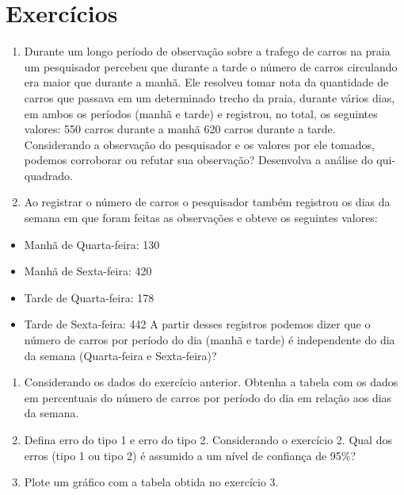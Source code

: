 \documentclass[14pt,titlepage, oneside, openany, a4paper]{book}
\providecommand{\tightlist}{%
  \setlength{\itemsep}{0pt}\setlength{\parskip}{0pt}}
\begin{document}
\hypertarget{exercuxedcios-2}{%
\section{Exercícios}\label{exercuxedcios-2}}

\begin{enumerate}
\def\labelenumi{\arabic{enumi})}
\item
  Durante um longo período de observação sobre a trafego de carros na praia um pesquisador percebeu que durante a tarde o número de carros circulando era maior que durante a manhã. Ele resolveu tomar nota da quantidade de carros que passava em um determinado trecho da praia, durante vários dias, em ambos os períodos (manhã e tarde) e registrou, no total, os seguintes valores: 550 carros durante a manhã 620 carros durante a tarde. Considerando a observação do pesquisador e os valores por ele tomados, podemos corroborar ou refutar sua observação? Desenvolva a análise do qui-quadrado.
\item
  Ao registrar o número de carros o pesquisador também registrou os dias da semana em que foram feitas as observações e obteve os seguintes valores:
\end{enumerate}

\begin{itemize}
\tightlist
\item
  Manhã de Quarta-feira: 130
\item
  Manhã de Sexta-feira: 420
\item
  Tarde de Quarta-feira: 178
\item
  Tarde de Sexta-feira: 442
  A partir desses registros podemos dizer que o número de carros por período do dia (manhã e tarde) é independente do dia da semana (Quarta-feira e Sexta-feira)?
\end{itemize}

\begin{enumerate}
\def\labelenumi{\arabic{enumi})}
\setcounter{enumi}{2}
\item
  Considerando os dados do exercício anterior. Obtenha a tabela com os dados em percentuais do número de carros por período do dia em relação aos dias da semana.
\item
  Defina erro do tipo 1 e erro do tipo 2. Considerando o exercício 2. Qual dos erros (tipo 1 ou tipo 2) é assumido a um nível de confiança de 95\%?
\item
  Plote um gráfico com a tabela obtida no exercício 3.
\end{enumerate}
\end{document}
